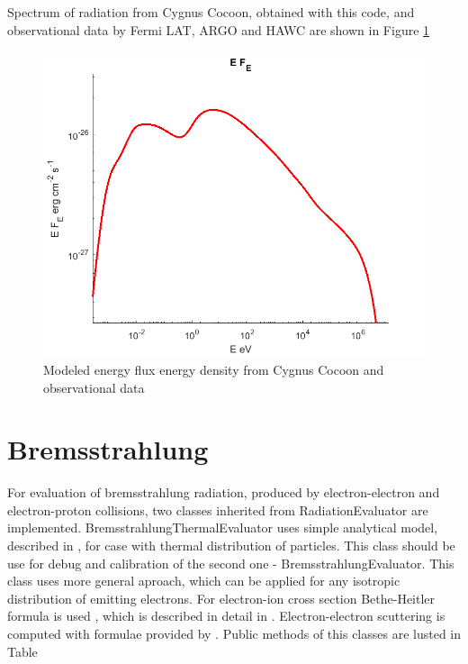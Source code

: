 Spectrum of radiation from Cygnus Cocoon, obtained with this code, and observational data by Fermi LAT, ARGO and HAWC \cite{Ackermann2011, Bartoli2014, Abeysekara2021} are shown in Figure \ref{pion}
\begin{figure}
	\centering
	\includegraphics[width=12.5 cm]{./fig/compton.png} 
	\caption{Modeled energy flux energy density from Cygnus Cocoon and observational data}
	\label{pion}
\end{figure}
\section{Bremsstrahlung}

For evaluation of bremsstrahlung radiation, produced by electron-electron and electron-proton collisions, two classes inherited from RadiationEvaluator are implemented. BremsstrahlungThermalEvaluator uses simple analytical model, described in \cite{Rybicki}, for case with thermal distribution of particles. This class should be use for debug and calibration of the second one - BremsstrahlungEvaluator. This class uses more general aproach, which can be applied for any isotropic distribution of emitting electrons. For electron-ion cross section Bethe-Heitler formula is used \cite{BetheHeitler}, which is described in detail in \cite{JauchRohrlich}. Electron-electron scuttering is computed with formulae provided by \cite{Baring1999}. Public methods of this classes are lusted in Table

